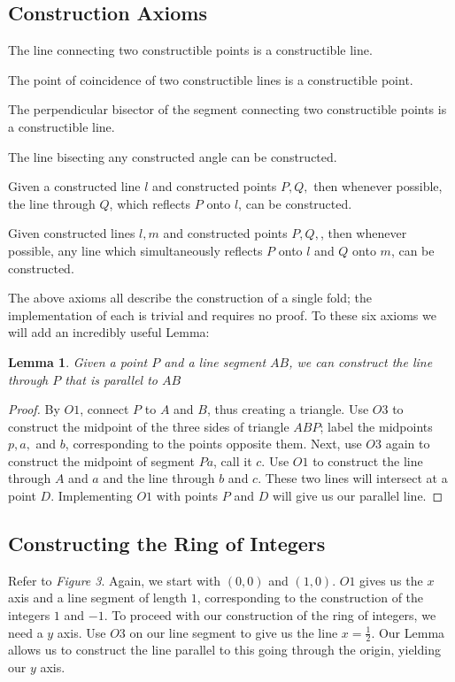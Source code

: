 \documentclass[]{article}
\newtheorem*{lemma}{Lemma}
\begin{document}
  \subsection{Construction Axioms}
  \begin{description}
  	\setlength\itemindent{.5pt}
  	\item[O1]
  	The line connecting two constructible points is a constructible line.
  	\item[O2]
  	The point of coincidence of two constructible lines is a constructible point.
  	\item[O3]
  	The perpendicular bisector of the segment connecting two constructible points is a constructible line.
  	\item[O4]
  	The line bisecting any constructed angle can be constructed.
  	\item[O5]
  	Given a constructed line $l$ and constructed points $P,Q,$ then whenever possible, the line through $Q$, which reflects $P$ onto $l$, can be constructed.
  	\item[O6]
  	Given constructed lines $l,m$ and constructed points $P,Q,$, then whenever possible, any line which simultaneously reflects $P$ onto $l$ and $Q$ onto $m$, can be constructed.
  \end{description}
  	The above axioms all describe the construction of a single fold; the implementation of each is trivial and requires no proof. To these six axioms we will add an incredibly useful Lemma:
    \begin{lemma}
    		Given a point $P$ and a line segment $AB$, we can construct the line through $P$ that is parallel to $AB$
    \end{lemma}
      \begin{proof}
      	By $O1$, connect $P$ to $A$ and $B$, thus creating a triangle. Use $O3$ to construct the midpoint of the three sides of triangle $ABP$; label the midpoints $p,a,$ and $b$, corresponding to the points opposite them. Next, use $O3$ again to construct the midpoint of segment $Pa$, call it $c$. Use $O1$ to construct the line through $A$ and $a$ and the line through $b$ and $c$. These two lines will intersect at a point $D$. Implementing $O1$ with points $P$ and $D$ will give us our parallel line.
      \end{proof}
      
  \subsection{Constructing the Ring of Integers}
  Refer to \emph{Figure 3}. Again, we start with $(0,0)$ and $(1,0)$. $O1$ gives us the $x$ axis and a line segment of length $1$, corresponding to the construction of the integers $1$ and $-1$.
  To proceed with our construction of the ring of integers, we need a $y$ axis. Use $O3$ on our line segment to give us the line $x=\frac{1}{2}$. Our Lemma allows us to construct the line parallel to this going through the origin, yielding our $y$ axis.
  
\end{document}
